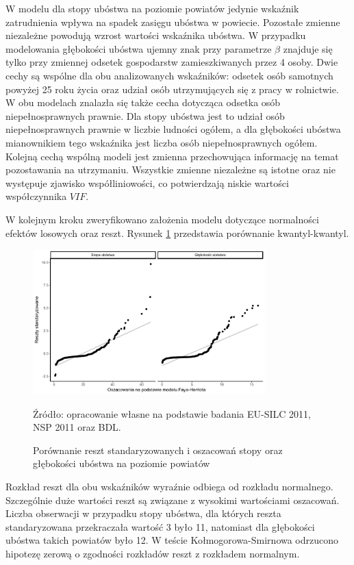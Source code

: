 W modelu dla stopy ubóstwa na poziomie powiatów jedynie wskaźnik zatrudnienia wpływa na spadek zasięgu ubóstwa w powiecie. Pozostałe zmienne niezależne powodują wzrost wartości wskaźnika ubóstwa. W przypadku modelowania głębokości ubóstwa ujemny znak przy parametrze $\beta$ znajduje się tylko przy zmiennej odsetek gospodarstw zamieszkiwanych przez 4 osoby. Dwie cechy są wspólne dla obu analizowanych wskaźników: odsetek osób samotnych powyżej 25 roku życia oraz udział osób utrzymujących się z pracy w rolnictwie. W obu modelach znalazła się także cecha dotycząca odsetka osób niepełnosprawnych prawnie. Dla stopy ubóstwa jest to udział osób niepełnosprawnych prawnie w liczbie ludności ogółem, a dla głębokości ubóstwa mianownikiem tego wskaźnika jest liczba osób niepełnosprawnych ogółem. Kolejną cechą wspólną modeli jest zmienna przechowująca informację na temat pozostawania na utrzymaniu. Wszystkie zmienne niezależne są istotne oraz nie występuje zjawisko współliniowości, co potwierdzają niskie wartości współczynnika $VIF$.

W kolejnym kroku zweryfikowano założenia modelu dotyczące normalności efektów losowych oraz reszt. Rysunek \ref{fig:fh_pow_r} przedstawia porównanie kwantyl-kwantyl.

\begin{figure}[htp]
\centering
\includegraphics[width=0.8\textwidth]{04_wykresy/fh_pow_r_model-1.pdf}
\caption{Porównanie reszt standaryzowanych i oszacowań stopy oraz głębokości ubóstwa na poziomie powiatów}
\small{Źródło: opracowanie własne na podstawie badania EU-SILC 2011, NSP 2011 oraz BDL.}
\label{fig:fh_pow_r}
\end{figure}

Rozkład reszt dla obu wskaźników wyraźnie odbiega od rozkładu normalnego. Szczególnie duże wartości reszt są związane z wysokimi wartościami oszacowań. Liczba obserwacji w przypadku stopy ubóstwa, dla których reszta standaryzowana przekraczała wartość 3 było 11, natomiast dla głębokości ubóstwa takich powiatów było 12. W teście Kołmogorowa-Smirnowa odrzucono hipotezę zerową o zgodności rozkładów reszt z rozkładem normalnym.

